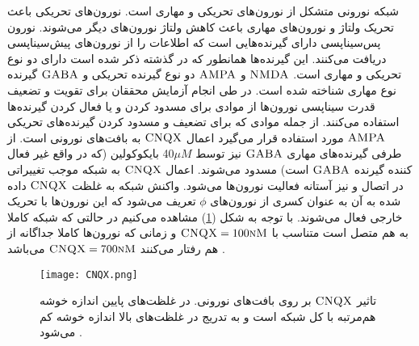 شبکه نورونی متشکل از نورون‌های تحریکی و مهاری است. نورون‌های تحریکی باعث تحریک ولتاژ و نورون‌های مهاری باعث کاهش ولتاژ نورون‌های دیگر می‌شوند. نورون پس‌سیناپسی دارای گیرنده‌هایی است که اطلاعات را از نورون‌های پیش‌سیناپسی دریافت می‌کنند. این گیرنده‌ها همانطور که در گذشته ذکر شده است دارای دو نوع تحریکی و مهاری است.
 $\textsc{NMDA}$
  و 
 $\textsc{AMPA}$
  دو نوع گیرنده تحریکی و 
 $\textsc{GABA}$
  گیرنده نوع مهاری شناخته شده است. در طی انجام آزمایش محققان برای تقویت و تضعیف قدرت سیناپسی نورون‌ها از موادی برای مسدود کردن و یا فعال کردن گیرنده‌ها استفاده می‌کنند. از جمله موادی که برای تضعیف و مسدود کردن گیرنده‌های تحریکی 
 $\textsc{AMPA}$
  مورد استفاده قرار می‌گیرد اعمال   $\textsc{CNQX}$  به بافت‌های نورونی است. از طرفی گیرنده‌های مهاری 
  $\textsc{GABA}$
   نیز توسط $\mu M$40
بایکوکولین (که در واقع غیر فعال کننده گیرنده
 $\textsc{GABA}$
  است) مسدود می‌شوند. اعمال   $\textsc{CNQX}$  به شبکه موجب تغییراتی در اتصال و نیز آستانه فعالیت نورون‌ها می‌شود. واکنش شبکه به غلظت   $\textsc{CNQX}$  داده شده به آن به عنوان کسری از نورون‌های $\phi$ تعریف می‌شود که این نورون‌ها با تحریک خارجی فعال می‌شوند. با توجه به شکل (\ref{fig:CNQX}) مشاهده می‌کنیم در حالتی که شبکه کاملا به هم متصل است متناسب با
   $\textsc{CNQX} = 100\textsc{nM}$
    و زمانی که نورون‌ها کاملا جداگانه‌ از هم رفتار می‌کنند
     $\textsc{CNQX} = 700\textsc{nM}$ 
     می‌باشد \cite{sori}.
\begin{figure} [htbp]
\centering
\texttt{[image: CNQX.png]} 
\caption[تاثیر   $\textsc{CNQX}$  بر روی بافت‌های نورونی] {\vspace{-0.01}\footnotesize تاثیر   $\textsc{CNQX}$  بر روی بافت‌های نورونی. در غلظت‌های پایین اندازه خوشه هم‌مرتبه با کل شبکه است و به تدریج در غلظت‌های بالا اندازه خوشه کم می‌شود \cite{sori}.}
\label{fig:CNQX}
\end{figure}

